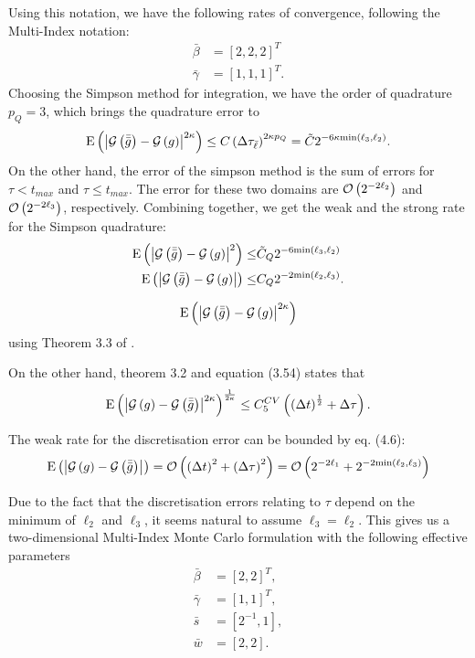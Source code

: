 \documentclass[11pt]{amsart}
\begin{document}
Using this notation, we have the following rates of convergence, following the Multi-Index notation:
\begin{align}
\bar \beta &= [2,2,2]^T \\
\bar \gamma &= [1,1,1]^T .
\end{align} 
Choosing the Simpson method for integration, we have the order of quadrature $p_Q=3$, which brings the quadrature error to 
\begin{align}
\mathrm{E} \left( {{\left| {\mathcal G\left( {\bar{\bar g}} \right) - \mathcal G \left( {g} \right)} \right|^{2 \kappa}}} \right) \leq C \left( {\Delta \tau_{\bar \ell}} \right)^{2 \kappa p_Q} = 
\tilde C 2^{-6 \kappa \mathrm{min} \left( {\ell_3,\ell_2} \right)}.
\end{align}
On the other hand, the error of the simpson method is the sum of errors for $\tau < t_{max}$ and $\tau \leq t_{max}$. The error for these two domains are $\mathcal O \left( {{2^{-2 \ell_2}}} \right)$ and $\mathcal O \left( {{2^{-2 \ell_3}}} \right)$, respectively. Combining together, we get the weak and the strong rate
for the Simpson quadrature:
\begin{align}
\mathrm{E} \left( {{\left| {\mathcal G\left( {\bar{\bar g}} \right) - \mathcal G \left( {g} \right)} \right|^{2}}} \right) \leq&  \tilde C_Q 2^{-6 \mathrm{min} \left( {\ell_3,\ell_2} \right)}
\\
\mathrm{E} \left( {{\left| {\mathcal G\left( {\bar{\bar g}} \right) - \mathcal G \left( {g} \right)} \right|}} \right) \leq& C_Q 2^{-2 \mathrm{min} \left( {\ell_2,\ell_3} \right)}.
\end{align}

\begin{align}
\mathrm{E} \left( {{\left| {\mathcal G\left( {\bar{\bar g}} \right) - \mathcal G \left( {g} \right)} \right|^{2 \kappa}}} \right)
\end{align}
using Theorem 3.3 of \cite{bjork2013monte}.

On the other hand, theorem 3.2 and equation (3.54) states that
\begin{align}
\mathrm{E} \left( {{ \left| { \mathcal G \left( {g} \right) - \mathcal G \left( {\bar{\bar g}} \right) } \right|^{2 \kappa}  }} \right) ^{\frac{1}{2 \kappa}} \leq C_{5}^{CV} \left( { \left( {\Delta t} \right)^{\frac{1}{2}} + \Delta \tau } \right).
\end{align}

The weak rate for the discretisation error can be bounded by eq. (4.6):
\begin{align}
\mathrm{E} \left( {{ \left| { \mathcal G \left( {g} \right) - \mathcal G \left( {\bar{\bar g}} \right) } \right|^{}  }} \right)
= 
 \mathcal O \left( {{\left( {\Delta t} \right)^2 + \left( {\Delta \tau} \right)^2}} \right)
 = \mathcal O \left( {{2^{-2 \ell_1} + 2^{-2 \mathrm {min} \left( {\ell_2,\ell_3} \right) }}} \right)
\end{align}

Due to the fact that the discretisation errors relating to $\tau$
depend on the minimum of $\ell_2$ and $\ell_3$, it seems natural
to assume $\ell_3=\ell_2$. This gives us a two-dimensional
Multi-Index Monte Carlo formulation with the following effective parameters
\begin{align}
\bar \beta &= [2,2]^T ,\\
\bar \gamma &= [1,1]^T , \\
\bar s &= [2^{-1},1], \\
\bar w & = [2,2].
\end{align}
\end{document}
